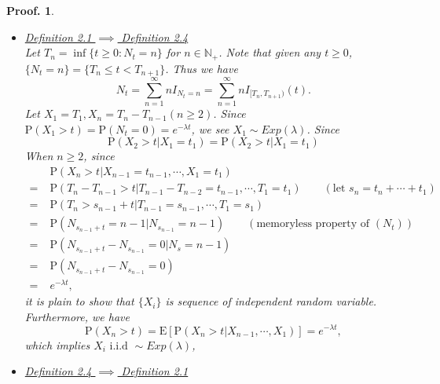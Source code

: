 \documentclass{article}
\theoremstyle{nonumberplain}
\newtheorem{Proof}{Proof.}
\begin{document}
\begin{Proof}
\begin{itemize}
	\item\noindent\underline{Definition 2.1 $\implies$ Definition 2.4}\\
	Let $T_n=\inf\{t\ge0:N_t= n\}$ for $n\in\mathbb{N}_+$. Note that given any $t\ge0$, $\{N_t=n\}=\{T_n\le t<T_{n+1}\}$. Thus we have
	\[
	N_t=\sum_{n=1}^{\infty}nI_{N_t=n}=\sum_{n=1}^{\infty}nI_{[T_n,T_{n+1})}(t).
	\]
	Let $X_1=T_1,X_{n}=T_{n}-T_{n-1}(n\ge2)$. Since $\mathrm{P}(X_1>t)=\mathrm{P}(N_t=0)=e^{-\lambda t}$, we see $X_1\sim Exp(\lambda)$. 
	Since
	\[
	\mathrm{P}(X_2>t|X_1=t_1)=\mathrm{P}(X_2>t|X_1=t_1)
	\]
	When $n\ge2$, since
	\begin{align*}
	&\mathrm{P}(X_n>t|X_{n-1}=t_{n-1},\cdots,X_1=t_1)\\
	=\;&\mathrm{P}(T_{n}-T_{n-1}>t|T_{n-1}-T_{n-2}=t_{n-1},\cdots,T_1=t_1)\qquad(\text{let }s_n=t_{n}+\cdots +t_1)\\
	=\;&\mathrm{P}(T_{n}>s_{n-1}+t|T_{n-1}=s_{n-1},\cdots,T_1=s_1)\\
	=\;&\mathrm{P}(N_{s_{n-1}+t}=n-1|N_{s_{n-1}}=n-1)\qquad(\text{memoryless property of }(N_t))\\
	=\;&\mathrm{P}(N_{s_{n-1}+t}-N_{s_{n-1}}=0|N_s=n-1)\\
	=\;&\mathrm{P}(N_{s_{n-1}+t}-N_{s_{n-1}}=0)\\
	=\;&e^{-\lambda t},
	\end{align*}
	it is plain to show that $\{X_i\}$ is sequence of independent random variable. Furthermore, we have $$\mathrm{P}(X_n>t)=\mathrm{E}[\mathrm{P}(X_n>t|X_{n-1},\cdots,X_1)]=e^{-\lambda t},$$
	which implies $X_i\text{ i.i.d }\sim Exp(\lambda)$,
	\item\noindent\underline{Definition 2.4 $\implies$ Definition 2.1}
	

\end{itemize}
\end{Proof}
\end{document}
